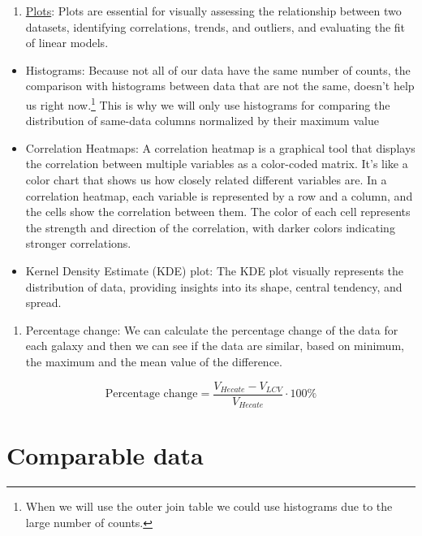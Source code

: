 \documentclass[
]{article}
\providecommand{\tightlist}{%
  \setlength{\itemsep}{0pt}\setlength{\parskip}{0pt}}\usepackage{longtable,booktabs,array}
\begin{document}
\begin{enumerate}
\def\labelenumi{\arabic{enumi}.}
\setcounter{enumi}{3}
\tightlist
\item
  \ul{Plots}: Plots are essential for visually assessing the
  relationship between two datasets, identifying correlations, trends,
  and outliers, and evaluating the fit of linear models.
\end{enumerate}

\begin{itemize}
\tightlist
\item
  Histograms: Because not all of our data have the same number of
  counts, the comparison with histograms between data that are not the
  same, doesn't help us right now.\footnote{When we will use the outer
    join table we could use histograms due to the large number of
    counts.} This is why we will only use histograms for comparing the
  distribution of same-data columns normalized by their maximum value
\end{itemize}

\begin{itemize}
\item
  Correlation Heatmaps: A correlation heatmap is a graphical tool that
  displays the correlation between multiple variables as a color-coded
  matrix. It's like a color chart that shows us how closely related
  different variables are. In a correlation heatmap, each variable is
  represented by a row and a column, and the cells show the correlation
  between them. The color of each cell represents the strength and
  direction of the correlation, with darker colors indicating stronger
  correlations.
\item
  Kernel Density Estimate (KDE) plot: The KDE plot visually represents
  the distribution of data, providing insights into its shape, central
  tendency, and spread.
\end{itemize}

\begin{enumerate}
\def\labelenumi{\arabic{enumi}.}
\setcounter{enumi}{4}
\tightlist
\item
  Percentage change: We can calculate the percentage change of the data
  for each galaxy and then we can see if the data are similar, based on
  minimum, the maximum and the mean value of the difference.
\end{enumerate}

\[\text{Percentage change} = \frac{V_{Hecate} - V_{LCV}}{V_{Hecate}}\cdot 100 \%\]

\section{Comparable data}\label{comparable-data}
\end{document}
